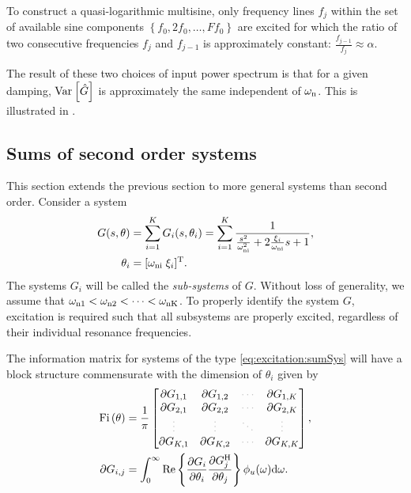 To construct a quasi-logarithmic multisine, only frequency lines $f_j$ within the set of available sine components $\left\{f_0, 2 f_0, \ldots, F f_0  \right\}$ are excited for which the ratio of two consecutive frequencies $f_j$ and $f_{j-1}$ is approximately constant: $\frac{f_{j-1}}{f_j} \approx \alpha$.

The result of these two choices of input power spectrum is that for a given damping, $\var{\hat{G}}$ is approximately the same independent of $\wn$. 
This is illustrated in .

\subsection{Sums of second order systems}
This section extends the previous section to more general systems than second order.
Consider a system
\begin{align}
G(s,\theta) &= \sum_{i=1}^{K} G_i(s,\theta_i)
             =\sum_{i=1}^{K}  \frac{1}
                                   {   \frac{s^2}{\wn[i]^2}
                                    + 2\frac{\damping_i}{\wn[i]}s
                                    + 1},\\
\theta_i&=[\wn[i]\;\damping_i]^{\T}.
\label{eq:excitation:sumSys}
\end{align}
The systems  $G_i$ will be called the \emph{sub-systems} of $G$. 
Without loss of generality, we assume that $\wn[1] < \wn[2] < \cdots < \wn[K]$. 
To properly identify the system $G$, excitation is required such that all subsystems are properly excited, regardless of their individual resonance frequencies.

The information matrix for systems of the type \eqref{eq:excitation:sumSys} will have a block structure commensurate with the dimension of $\theta_i$ given by
\begin{align}
\IF &= \frac{1}{\pi}
\begin{bmatrix}
  \partial G_{1,1}        &\partial G_{1,2}       &\deemph{\cdots}         &\partial G_{1,K}\\
  \partial G_{2,1}        &\partial G_{2,2}       &\deemph{\cdots}         &\partial G_{2,K}\\
  \deemph{\vdots}                  &\deemph{\vdots}                 &\deemph{\ddots}         &\deemph{\vdots}          \\
  \partial G_{K,1}        &\partial G_{K,2}       &\deemph{\cdots}         &\partial G_{K,K}
\end{bmatrix},\\
\partial G_{i,j} &= \int_0^\infty
                      \mathrm{Re}\left\{
                          \frac{\partial G_i}
                               {\partial \theta_i}
                          \frac{\partial G_j^{\HT}}
                               {\partial \theta_j}
                                \right\}
                      \phi_u(\omega)\dd\omega.
\end{align}

